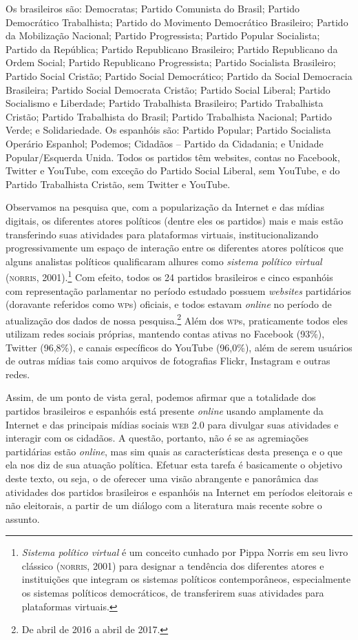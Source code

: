 Os brasileiros são: Democratas; Partido Comunista do Brasil; Partido Democrático
Trabalhista; Partido do Movimento Democrático Brasileiro; Partido da Mobilização
Nacional; Partido Progressista; Partido Popular Socialista; Partido da República; Partido Republicano Brasileiro; Partido Republicano da Ordem Social; Partido Republicano
Progressista; Partido Socialista Brasileiro; Partido Social Cristão; Partido Social
Democrático; Partido da Social Democracia Brasileira; Partido Social
Democrata Cristão; Partido Social Liberal; Partido Socialismo e
Liberdade; Partido Trabalhista Brasileiro; Partido Trabalhista
Cristão; Partido Trabalhista do Brasil; Partido Trabalhista
Nacional; Partido Verde; e Solidariedade.
Os espanhóis são: Partido Popular; Partido Socialista
Operário Espanhol; Podemos; Cidadãos -- Partido da
Cidadania; e Unidade Popular/Esquerda Unida.
Todos os partidos têm websites, contas no Facebook, Twitter e YouTube, com exceção do Partido Social Liberal, sem YouTube, e do Partido Trabalhista Cristão, sem Twitter e YouTube.


Observamos na pesquisa que, com a popularização da Internet e das mídias
digitais, os diferentes atores políticos (dentre eles os partidos) mais
e mais estão transferindo suas atividades para plataformas virtuais,
institucionalizando progressivamente um espaço de interação entre os
diferentes atores políticos que alguns analistas políticos qualificaram
alhures como \textit{sistema político virtual} (\textsc{norris}, 2001).\footnote{\textit{Sistema
  político virtual} é um conceito cunhado por Pippa Norris em seu livro
  clássico (\textsc{norris}, 2001) para designar a tendência dos diferentes
  atores e instituições que integram os sistemas políticos
  contemporâneos, especialmente os sistemas políticos democráticos, de
  transferirem suas atividades para plataformas virtuais.} Com efeito,
todos os 24 partidos brasileiros e cinco espanhóis com representação
parlamentar no período estudado possuem \textit{websites} partidários (doravante
referidos como \textsc{wp}s) oficiais, e todos estavam \textit{online} no período de
atualização dos dados de nossa pesquisa.\footnote{De abril de 2016 a abril de 2017.}
Além dos \textsc{wp}s, praticamente todos eles utilizam redes sociais próprias,
mantendo contas ativas no Facebook (93\%), Twitter (96,8\%), e canais
específicos do YouTube (96,0\%), além de serem usuários de outras mídias
tais como arquivos de fotografias Flickr, Instagram e outras redes.

Assim, de um ponto de vista geral, podemos afirmar que a totalidade dos
partidos brasileiros e espanhóis está presente \textit{online} usando amplamente
da Internet e das principais mídias sociais \textsc{web 2.0} para divulgar
suas atividades e interagir com os cidadãos. A questão, portanto, não é
se as agremiações partidárias estão \textit{online}, mas sim quais as
características desta presença e o que ela nos diz de sua atuação
política. Efetuar esta tarefa é basicamente o objetivo deste texto, ou
seja, o de oferecer uma visão abrangente e panorâmica das atividades dos
partidos brasileiros e espanhóis na Internet em períodos eleitorais e
não eleitorais, a partir de um diálogo com a literatura mais recente
sobre o assunto.

